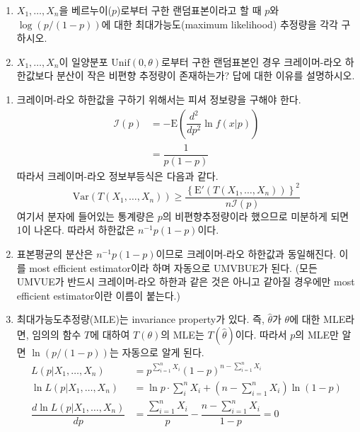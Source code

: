 \documentclass[answers]{exam}
\begin{document}
\begin{questions}
\begin{enumerate}
    \item $X_{1},\ldots, X_{n}$을 베르누이($p$)로부터 구한 랜덤표본이라고 할 때 $p$와 $\log\left(p/\left(1-p\right)\right)$에 대한 최대가능도(maximum likelihood) 추정량을 각각 구하시오.
    \item $X_{1}, \ldots , X_{n}$이 일양분포 $\mathrm{Unif}\left(0,\theta\right)$로부터 구한 랜덤표본인 경우 크레이머-라오 하한값보다 분산이 작은 비편향 추정량이 존재하는가? 답에 대한 이유를 설명하시오.
   \end{enumerate}
   \begin{solution}
    \begin{enumerate}
      \item 크레이머-라오 하한값을 구하기 위해서는 피셔 정보량을 구해야 한다. 
      \begin{align}
        \mathcal{I}\left(p\right) &= -\mathrm{E}\left(\dfrac{d^{2}}{dp^{2}}\ln f\left(x|p\right)\right)\\
        &= \dfrac{1}{p\left(1-p\right)}
      \end{align}
      따라서 크레이머-라오 정보부등식은 다음과 같다.
      $$
        \mathrm{Var}\left(T\left(X_{1},\ldots,X_{n}\right)\right) \geq \dfrac{\left\{\mathrm{E}'\left(T\left(X_{1},\ldots,X_{n}\right)\right)\right\}^{2}}{n\mathcal{I}\left(p\right)}
      $$
      여기서 분자에 들어있는 통계량은 $p$의 비편향추정량이라 했으므로 미분하게 되면 1이 나온다. 따라서 하한값은 $n^{-1}p\left(1-p\right)$이다.
      \item 표본평균의 분산은 $n^{-1}p\left(1-p\right)$이므로 크레이머-라오 하한값과 동일해진다. 이를 most efficient estimator이라 하며 자동으로 UMVBUE가 된다. (모든 UMVUE가 반드시 크레이머-라오 하한과 같은 것은 아니고 같아질 경우에만 most efficient estimator이란 이름이 붙는다.)
      \item 최대가능도추정량(MLE)는 invariance property가 있다. 즉, $\hat{\theta}$가 $\theta$에 대한 MLE라면, 임의의 함수 $T$에 대하여 $T\left(\theta\right)$의 MLE는 $T\left(\hat{\theta}\right)$이다. 따라서 $p$의 MLE만 알면 $\ln\left(p/\left(1-p\right)\right)$는 자동으로 알게 된다.
      \begin{align}
        L\left(p|X_{1},\ldots,X_{n}\right) &= p^{\sum_{i=1}^{n}X_{i}}\left(1-p\right)^{n-\sum_{i=1}^{n}X_{i}}\\
        \ln L\left(p|X_{1},\ldots,X_{n}\right) &= \ln p \cdot \sum_{i}^{n}X_{i}+\left(n-\sum_{i=1}^{n}X_{i}\right)\ln\left(1-p\right)\\
        \dfrac{d\ln L\left(p|X_{1},\ldots,X_{n}\right)}{dp} &= \dfrac{\sum_{i=1}^{n}X_{i}}{p}-\dfrac{n-\sum_{i=1}^{n}X_{i}}{1-p}=0\\

\end{align}
\end{enumerate}
\end{solution}
\end{questions}
\end{document}
